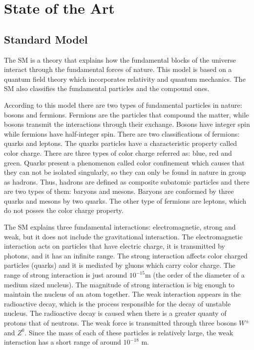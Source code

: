 \chapter{State of the Art} 
\label{State_Art_chapter}

\section{Standard Model}

The SM is a theory that explains how the fundamental blocks of the universe interact through the fundamental forces of nature. This model is based on a quantum field theory which incorporates relativity and quantum mechanics. The SM also classifies the fundamental particles and the compound ones. 

According to this model there are two types of fundamental particles in nature: bosons and fermions. Fermions are the particles that compound the matter, while bosons transmit the interactions through their exchange. Bosons have integer spin while fermions have half-integer spin. There are two classifications of fermions: quarks and leptons. The quarks particles have a characteristic property called color charge. There are three types of color charge referred as: blue, red and green. Quarks present a phenomenon called color confinement which causes that they can not be isolated singularly, so they can only be found in nature in group as hadrons. Thus, hadrons are defined as composite subatomic particles and there are two types of them: baryons and mesons. Baryons are conformed by three quarks and mesons by two quarks. The other type of fermions are leptons, which do not posses the color charge property.

The SM explains three fundamental interactions: electromagnetic, strong and weak, but it does not include the gravitational interaction. The electromagnetic interaction acts on particles that have electric charge, it is transmitted by photons, and it has an infinite range. The strong interaction affects color charged particles (quarks) and it is mediated by gluons which carry color charge. The range of strong interaction is just around $10^{-15}$m (the order of the diameter of a medium sized nucleus). The magnitude of strong interaction is big enough to maintain the nucleus of an atom together. The weak interaction appears in the radioactive decay, which is the process responsible for the decay of unstable nucleus. The radioactive decay is caused when there is a greater quanty of protons that of neutrons. The weak force is transmitted through three bosons $W^{\pm}$ and $Z^0$. Since the mass of each of these particles is relatively large, the weak interaction has a short range of around $10^{-18}$ m. 

